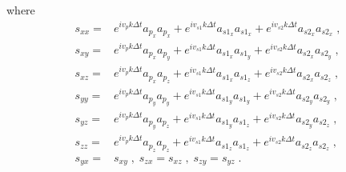 where
\begin{eqnarray}
    \label{eq:exps}
s_{xx} =& e^{i v_p k \Delta t} a_{p_x} a_{p_x} + e^{i v_{s1} k \Delta t} a_{s1_x} a_{s1_x} + e^{i v_{s2} k \Delta t} a_{s2_x} a_{s2_x} \;, \\ \nonumber
s_{xy} =& e^{i v_p k \Delta t} a_{p_x} a_{p_y} + e^{i v_{s1} k \Delta t} a_{s1_x} a_{s1_y} + e^{i v_{s2} k \Delta t} a_{s2_x} a_{s2_y} \;, \\ \nonumber
s_{xz} =& e^{i v_p k \Delta t} a_{p_x} a_{p_z} + e^{i v_{s1} k \Delta t} a_{s1_x} a_{s1_z} + e^{i v_{s2} k \Delta t} a_{s2_x} a_{s2_z} \;, \\ \nonumber
s_{yy} =& e^{i v_p k \Delta t} a_{p_y} a_{p_y} + e^{i v_{s1} k \Delta t} a_{s1_y} a_{s1_y} + e^{i v_{s2} k \Delta t} a_{s2_y} a_{s2_y} \;, \\ \nonumber
s_{yz} =& e^{i v_p k \Delta t} a_{p_y} a_{p_z} + e^{i v_{s1} k \Delta t} a_{s1_y} a_{s1_z} + e^{i v_{s2} k \Delta t} a_{s2_y} a_{s2_z} \;, \\ \nonumber
s_{zz} =& e^{i v_p k \Delta t} a_{p_z} a_{p_z} + e^{i v_{s1} k \Delta t} a_{s1_z} a_{s1_z} + e^{i v_{s2} k \Delta t} a_{s2_z} a_{s2_z} \;, \\ \nonumber
s_{yx} =& s_{xy} \;,\; s_{zx} = s_{xz} \;,\; s_{zy} = s_{yz} \;.
\end{eqnarray}

